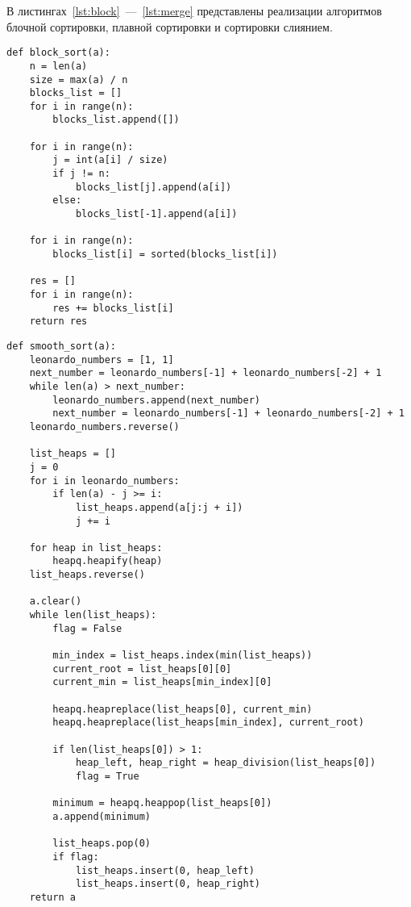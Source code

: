 В листингах~\ref{lst:block}~---~\ref{lst:merge} представлены реализации алгоритмов блочной сортировки, плавной сортировки и сортировки слиянием.

\begin{center}
	\captionsetup{justification=raggedright,singlelinecheck=off}
	\begin{lstlisting}[label=lst:block,caption=Реализация алгоритма блочной сортировки]
def block_sort(a):
	n = len(a)
	size = max(a) / n
	blocks_list = []
	for i in range(n):
		blocks_list.append([])
	
	for i in range(n):
		j = int(a[i] / size)
		if j != n:
			blocks_list[j].append(a[i])
		else:
			blocks_list[-1].append(a[i])
	
	for i in range(n):
		blocks_list[i] = sorted(blocks_list[i])
	
	res = []
	for i in range(n):
		res += blocks_list[i]
	return res
	\end{lstlisting}
\end{center}

\begin{center}
	\captionsetup{justification=raggedright,singlelinecheck=off}
	\begin{lstlisting}[label=lst:smooth,caption=Реализация алгоритма плавной сортировки]
def smooth_sort(a):
	leonardo_numbers = [1, 1]
	next_number = leonardo_numbers[-1] + leonardo_numbers[-2] + 1
	while len(a) > next_number:
		leonardo_numbers.append(next_number)
		next_number = leonardo_numbers[-1] + leonardo_numbers[-2] + 1
	leonardo_numbers.reverse()
	
	list_heaps = []
	j = 0
	for i in leonardo_numbers:
		if len(a) - j >= i:
			list_heaps.append(a[j:j + i])
			j += i
	
	for heap in list_heaps:
		heapq.heapify(heap)
	list_heaps.reverse()
	
	a.clear()
	while len(list_heaps):
		flag = False
	
		min_index = list_heaps.index(min(list_heaps))
		current_root = list_heaps[0][0]
		current_min = list_heaps[min_index][0]
		
		heapq.heapreplace(list_heaps[0], current_min)
		heapq.heapreplace(list_heaps[min_index], current_root)
	
		if len(list_heaps[0]) > 1:
			heap_left, heap_right = heap_division(list_heaps[0])
			flag = True
		
		minimum = heapq.heappop(list_heaps[0])
		a.append(minimum)
		
		list_heaps.pop(0)
		if flag:
			list_heaps.insert(0, heap_left)
			list_heaps.insert(0, heap_right)
	return a
	\end{lstlisting}
\end{center}

